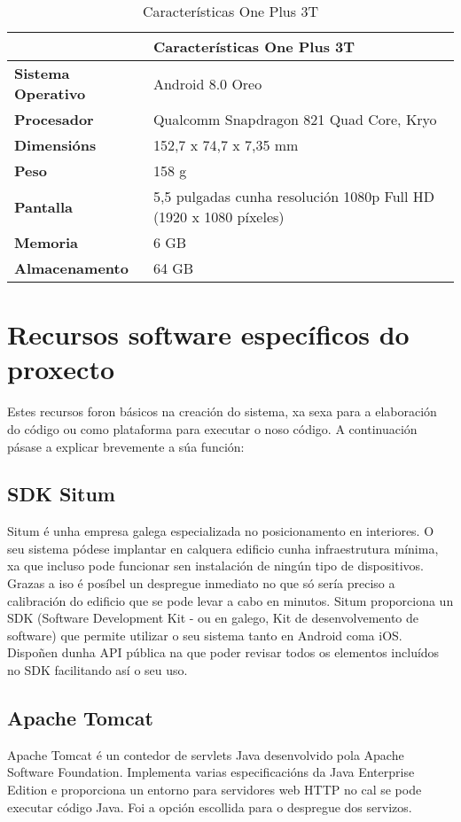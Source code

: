 \begin{table} [tbh]
	\centering
	\footnotesize
	\begin{tabular}{|l|p{10cm}|}
		\hline 
		& \textbf{Características One Plus 3T} \\ 
		\hline 
		\textbf{Sistema Operativo} & Android 8.0 Oreo \\ 
		\hline 
		\textbf{Procesador} & Qualcomm Snapdragon 821 Quad Core, Kryo \\ 
		\hline 
		\textbf{Dimensións} & 152,7 x 74,7 x 7,35 mm \\ 
		\hline 
		\textbf{Peso} & 158 g \\ 
		\hline 
		\textbf{Pantalla} & 5,5 pulgadas cunha resolución 1080p Full HD (1920 x 1080 píxeles) \\ 
		\hline 
		\textbf{Memoria} & 6 GB \\ 
		\hline
		\textbf{Almacenamento} & 64 GB \\ 
		\hline 
	\end{tabular}
	\caption{Características One Plus 3T}
	\label{tab:tabCaracteristicasOnePlus}
\end{table}


\section{Recursos software específicos do proxecto}
Estes recursos foron básicos na creación do sistema, xa sexa para a elaboración do código ou como plataforma para executar o noso código. A continuación pásase a explicar brevemente a súa función:

\subsection{SDK Situm}
Situm \cite{situm} é unha empresa galega especializada no posicionamento en interiores. O seu sistema pódese implantar en calquera edificio cunha infraestrutura mínima, xa que incluso pode funcionar sen instalación de ningún tipo de dispositivos. Grazas a iso é posíbel un despregue inmediato no que só sería preciso a calibración do edificio que se pode levar a cabo en minutos. Situm proporciona un SDK (Software Development Kit - ou en galego, Kit de desenvolvemento de software) \cite{situmDevelopers} que permite utilizar o seu sistema tanto en Android coma iOS. Dispoñen dunha API pública na que poder revisar todos os elementos incluídos no SDK facilitando así o seu uso.


\subsection{Apache Tomcat}
Apache Tomcat \cite{tomcat} é un contedor de servlets Java desenvolvido pola Apache Software Foundation. Implementa varias especificacións da Java Enterprise Edition e proporciona un entorno para servidores web HTTP no cal se pode executar código Java. Foi a opción escollida para o despregue dos servizos.


